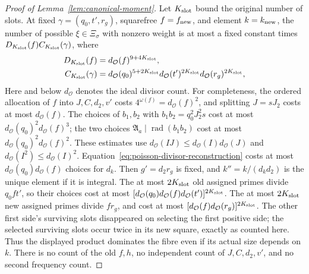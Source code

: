 \documentclass[12pt]{article}
\begin{document}
\begin{proof}[Proof of Lemma~\ref{lem:canonical-moment}]
Let \(K_{\rm slot}\) bound the original number of slots.  At fixed
\(\gamma=(q_0,t',r_g)\), squarefree \(f=f_{\rm new}\), and element
\(k=k_{\rm new}\), the number of possible \(\xi\in\Xi_\sigma\) with
nonzero weight is at most a fixed constant times
\(D_{K_{\rm slot}}(f)C_{K_{\rm slot}}(\gamma)\), where
\begin{equation}\label{eq:inverse-new-fibre}
 \begin{split}
 D_{K_{\rm slot}}(f)&=d_{\mathcal O}(f)^{9+4K_{\rm slot}},\\
 C_{K_{\rm slot}}(\gamma)&=
 d_{\mathcal O}(q_0)^{5+2K_{\rm slot}}
 d_{\mathcal O}(t')^{2K_{\rm slot}}
 d_{\mathcal O}(r_g)^{2K_{\rm slot}},
 \end{split}
\end{equation}
Here and below \(d_{\mathcal O}\) denotes the ideal divisor count.
For completeness, the ordered allocation of \(f\) into
\(J,C,d_2,v'\) costs \(4^{\omega(f)}=d_{\mathcal O}(f)^2\), and
splitting \(J=sJ_2\) costs at most \(d_{\mathcal O}(f)\).
The choices of \(b_1,b_2\) with
\(b_1b_2=q_0^2J_2^2s\) cost at most
\(d_{\mathcal O}(q_0)^2d_{\mathcal O}(f)^3\); the two choices
\(\mathfrak A_a\mid\operatorname{rad}(b_1b_2)\) cost at most
\(d_{\mathcal O}(q_0)^2d_{\mathcal O}(f)^2\).  These estimates use
\(d_{\mathcal O}(IJ)\le d_{\mathcal O}(I)d_{\mathcal O}(J)\) and
\(d_{\mathcal O}(I^2)\le d_{\mathcal O}(I)^2\).
Equation~\eqref{eq:poisson-divisor-reconstruction} costs at most
\(d_{\mathcal O}(q_0)d_{\mathcal O}(f)\) choices for \(d_k\).
Then \(g'=d_2r_g\) is fixed, and \(k''=k/(d_kd_2)\) is the unique
element if it is integral.  The at most \(2K_{\rm slot}\) old assigned
primes divide \(q_0ft'\), so their choices cost at most
\([d_{\mathcal O}(q_0)d_{\mathcal O}(f)d_{\mathcal O}(t')]^{2K_{\rm slot}}\).
The at most \(2K_{\rm slot}\) new assigned primes divide \(fr_g\),
and cost at most
\([d_{\mathcal O}(f)d_{\mathcal O}(r_g)]^{2K_{\rm slot}}\).
The other first side's surviving slots disappeared on selecting the
first positive side; the selected surviving slots occur twice in its
new square, exactly as counted here.  Thus the displayed product
dominates the fibre even if its actual size depends on \(k\).
There is no count of the old \(f,h\), no independent count of
\(J,C,d_2,v'\), and no second frequency count.


\end{proof}
\end{document}
